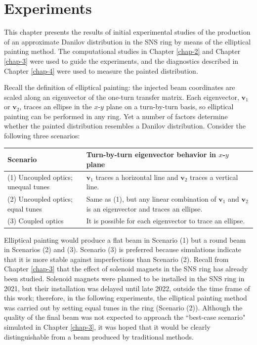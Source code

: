 \chapter{Experiments} \label{chap-5}

This chapter presents the results of initial experimental studies of the production of an approximate Danilov distribution in the SNS ring by means of the elliptical painting method. The computational studies in Chapter \ref{chap-2} and Chapter \ref{chap-3} were used to guide the experiments, and the diagnostics described in Chapter \ref{chap-4} were used to measure the painted distribution.

Recall the definition of elliptical painting: the injected beam coordinates are scaled along an eigenvector of the one-turn transfer matrix. Each eigenvector, $\mathbf{v}_1$ or $\mathbf{v}_2$, traces an ellipse in the $x$-$y$ plane on a turn-by-turn basis, so elliptical painting can be performed in any ring. Yet a number of factors determine whether the painted distribution resembles a Danilov distribution. Consider the following three scenarios:

\begin{table}[h!]
    \centering
    \begin{tabularx}{1.0\textwidth} { 
        | >{\raggedright\arraybackslash}X 
        | >{\raggedright\arraybackslash}X | }
     \hline
     \textbf{Scenario} & \textbf{Turn-by-turn eigenvector behavior in $x$-$y$ plane} \\
     \hline
     (1) Uncoupled optics; unequal tunes & $\mathbf{v}_1$ traces a horizontal line and $\mathbf{v}_2$ traces a vertical line. \\
     \hline
     (2) Uncoupled optics; equal tunes & Same as (1), but any linear combination of $\mathbf{v}_1$ and $\mathbf{v}_2$ is an eigenvector and traces an ellipse. \\
     \hline
     (3) Coupled optics & It is possible for each eigenvector to trace an ellipse. \\
    \hline
    \end{tabularx}
    \label{tab:painting_scenarios}
\end{table}

Elliptical painting would produce a flat beam in Scenario (1) but a round beam in Scenarios (2) and (3). Scenario (3) is preferred because simulations indicate that it is more stable against imperfections than Scenario (2). Recall from Chapter \ref{chap-3} that the effect of solenoid magnets in the SNS ring has already been studied. Solenoid magnets were planned to be installed in the SNS ring in 2021, but their installation was delayed until late 2022, outside the time frame of this work; therefore, in the following experiments, the elliptical painting method was carried out by setting equal tunes in the ring (Scenario (2)). Although the quality of the final beam was not expected to approach the ``best-case scenario" simulated in Chapter \ref{chap-3}, it was hoped that it would be clearly distinguishable from a beam produced by traditional methods. 

